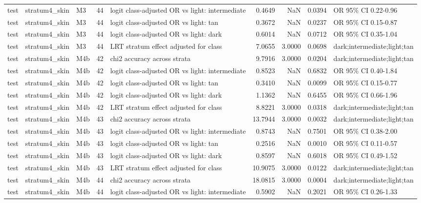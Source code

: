 \begin{tabular}{lllrlrrrl}
test & stratum4\_skin & M3 & 44 & logit class-adjusted OR vs light: intermediate & 0.4649 & NaN & 0.0394 & OR 95\% CI 0.22-0.96 \\
test & stratum4\_skin & M3 & 44 & logit class-adjusted OR vs light: tan & 0.3672 & NaN & 0.0237 & OR 95\% CI 0.15-0.87 \\
test & stratum4\_skin & M3 & 44 & logit class-adjusted OR vs light: dark & 0.6014 & NaN & 0.0712 & OR 95\% CI 0.35-1.04 \\
test & stratum4\_skin & M3 & 44 & LRT stratum effect adjusted for class & 7.0655 & 3.0000 & 0.0698 & dark;intermediate;light;tan \\
test & stratum4\_skin & M4b & 42 & chi2 accuracy across strata & 9.7916 & 3.0000 & 0.0204 & dark;intermediate;light;tan \\
test & stratum4\_skin & M4b & 42 & logit class-adjusted OR vs light: intermediate & 0.8523 & NaN & 0.6832 & OR 95\% CI 0.40-1.84 \\
test & stratum4\_skin & M4b & 42 & logit class-adjusted OR vs light: tan & 0.3410 & NaN & 0.0099 & OR 95\% CI 0.15-0.77 \\
test & stratum4\_skin & M4b & 42 & logit class-adjusted OR vs light: dark & 1.1362 & NaN & 0.6455 & OR 95\% CI 0.66-1.96 \\
test & stratum4\_skin & M4b & 42 & LRT stratum effect adjusted for class & 8.8221 & 3.0000 & 0.0318 & dark;intermediate;light;tan \\
test & stratum4\_skin & M4b & 43 & chi2 accuracy across strata & 13.7944 & 3.0000 & 0.0032 & dark;intermediate;light;tan \\
test & stratum4\_skin & M4b & 43 & logit class-adjusted OR vs light: intermediate & 0.8743 & NaN & 0.7501 & OR 95\% CI 0.38-2.00 \\
test & stratum4\_skin & M4b & 43 & logit class-adjusted OR vs light: tan & 0.2516 & NaN & 0.0010 & OR 95\% CI 0.11-0.57 \\
test & stratum4\_skin & M4b & 43 & logit class-adjusted OR vs light: dark & 0.8597 & NaN & 0.6018 & OR 95\% CI 0.49-1.52 \\
test & stratum4\_skin & M4b & 43 & LRT stratum effect adjusted for class & 10.9075 & 3.0000 & 0.0122 & dark;intermediate;light;tan \\
test & stratum4\_skin & M4b & 44 & chi2 accuracy across strata & 18.0815 & 3.0000 & 0.0004 & dark;intermediate;light;tan \\
test & stratum4\_skin & M4b & 44 & logit class-adjusted OR vs light: intermediate & 0.5902 & NaN & 0.2021 & OR 95\% CI 0.26-1.33 \\

\end{tabular}
